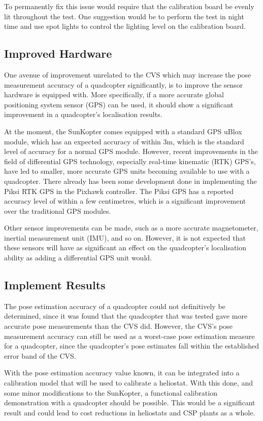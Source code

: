 To permanently fix this issue would require that the calibration board be evenly lit throughout the test. One suggestion would be to perform the test in night time and use spot lights to control the lighting level on the calibration board. 

\subsection{Improved Hardware}

One avenue of improvement unrelated to the CVS which may increase the pose measurement accuracy of a quadcopter significantly, is to improve the sensor hardware is equipped with. More specifically, if a more accurate global positioning system sensor (GPS) can be used, it should show a significant improvement in a quadcopter's localisation results. 

At the moment, the SunKopter comes equipped with a standard GPS uBlox module, which has an expected accuracy of within 3m, which is the standard level of accuracy for a normal GPS module. However, recent improvements in the field of differential GPS technology, especially real-time kinematic (RTK) GPS's, have led to smaller, more accurate GPS units becoming available to use with a quadcopter. There already has been some development done in implementing the Piksi RTK GPS in the Pixhawk controller. The Piksi GPS has a reported accuracy level of within a few centimetres, which is a significant improvement over the traditional GPS modules. 

Other sensor improvements can be made, such as a more accurate magnetometer, inertial measurement unit (IMU), and so on. However, it is not expected that these sensors will have as significant an effect on the quadcopter's localisation ability as adding a differential GPS unit would. 

\subsection{Implement Results}

The pose estimation accuracy of a quadcopter could not definitively be determined, since it was found that the quadcopter that was tested gave more accurate pose measurements than the CVS did. However, the CVS's pose measurement accuracy can still be used as a worst-case pose estimation measure for a quadcopter, since the quadcopter's pose estimates fall within the established error band of the CVS.\@ 

With the pose estimation accuracy value known, it can be integrated into a calibration model that will be used to calibrate a heliostat. With this done, and some minor modifications to the SunKopter, a functional calibration demonstration with a quadcopter should be possible. This would be a significant result and could lead to cost reductions in heliostats and CSP plants as a whole.  


